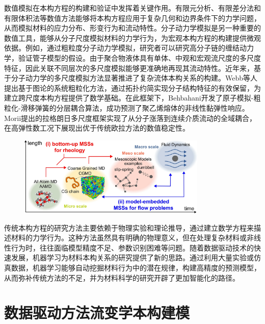 数值模拟在本构方程的构建和验证中发挥着关键作用。有限元分析、有限差分法和有限体积法等数值方法能够将本构方程应用于复杂几何和边界条件下的力学问题，从而模拟材料的应力分布、形变行为和流动特性\cite{alvesNumericalMethodsViscoelastic2021}。分子动力学模拟是另一种重要的数值工具，能够从分子尺度模拟材料的力学行为，为宏观本构方程的构建提供微观依据。例如，通过粗粒度分子动力学模拟，研究者可以研究高分子链的缠结动力学，验证管子模型的假设\cite{li2023coupling,sgouros2017slip}。由于聚合物液体具有单体、中观和宏观流尺度的多尺度特征，因此关联不同层次的多尺度模拟能够更准确地再现其流动特性\cite{satoRecentDevelopmentsMultiscale2024}。近年来，基于分子动力学的多尺度模拟方法显著推进了复杂流体本构关系的构建。Webb等人提出基于图论的系统粗粒化方法，通过拓扑约简实现分子结构特征的有效保留，为建立跨尺度本构方程提供了数学基础\cite{webb2018graph}。在此框架下，Behbahani开发了原子模拟-粗粒化-滑移弹簧的分层耦合算法，成功预测了聚乙烯熔体的非线性黏弹性响应\cite{behbahani2021dynamics}。Morii提出的拉格朗日多尺度框架实现了从分子涨落到连续介质流动的全域耦合，在高弹性数工况下展现出优于传统欧拉方法的数值稳定性\cite{morii2021lagrangian}。
\begin{figure}[htbp]
  \centering
  \includegraphics[width=0.8\textwidth]{Fig/duochidumoni.png}
\end{figure}

传统本构方程的研究方法主要依赖于物理实验和理论推导，通过建立数学方程来描述材料的力学行为。这种方法虽然具有明确的物理意义，但在处理复杂材料或非线性行为时，往往面临模型精度不足、参数识别困难等问题\cite{amamotoDatadrivenApproachesStructureproperty2022}。随着数据驱动技术的快速发展，机器学习为材料本构关系的研究提供了新的思路。通过利用大量实验或仿真数据，机器学习能够自动挖掘材料行为中的潜在规律，构建高精度的预测模型，从而弥补传统方法的不足，并为材料科学的研究开辟了更加智能化的路径。
\section{数据驱动方法流变学本构建模}
